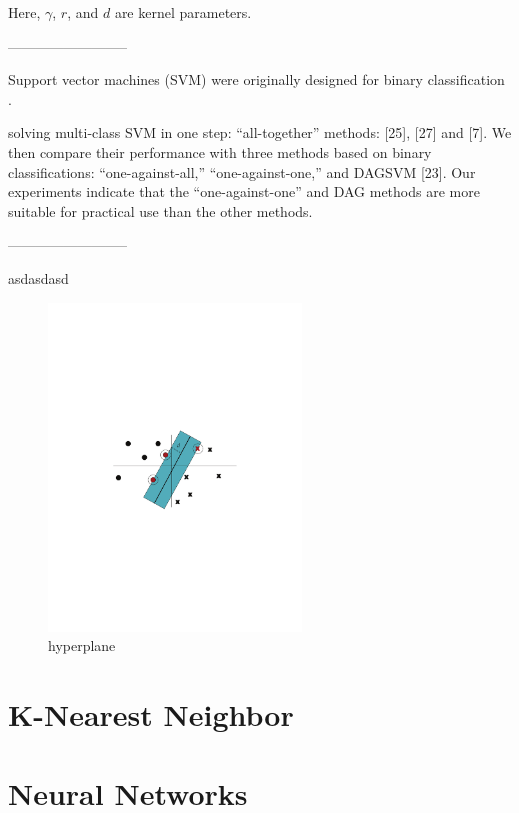 Here, $\gamma$, $r$, and $d$ are kernel parameters.

--------------------------

Support vector machines (SVM) were originally designed for binary classification \cite{hsu2002comparison}.

solving multi-class SVM in one step: “all-together” methods: [25], [27] and [7]. We then compare their performance with three methods based on binary classifications: “one-against-all,” “one-against-one,” and DAGSVM [23]. Our experiments indicate that the “one-against-one” and DAG methods are more suitable for practical use than the other methods. 

--------------------------

asdasdasd \cite{berwick2003idiot}

\begin{figure}[!htp]
  \center
  \includegraphics[width=0.6\textwidth]{figures/hyperplane}
  \caption{hyperplane}
  \label{fig:hyperplane}
\end{figure}

\fi

\section{K-Nearest Neighbor}

\section{Neural Networks}
